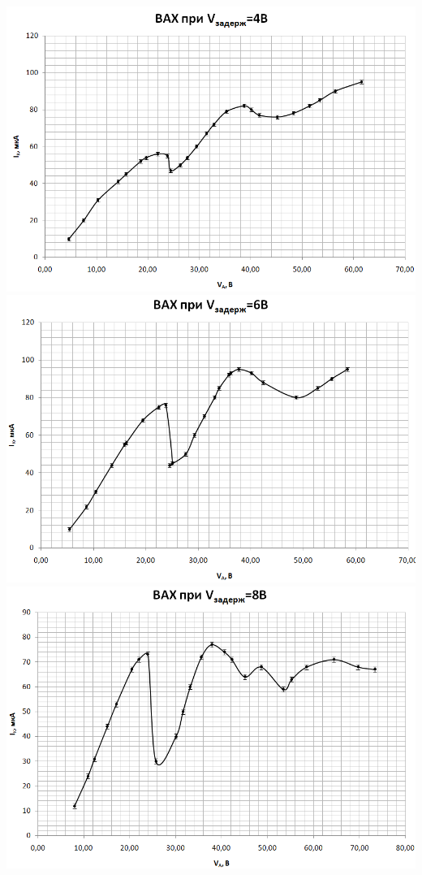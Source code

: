 \documentclass[12pt]{article}
\begin{document}
    \begin{center}
    	\includegraphics[width=15cm]{graph1.png}
    	\includegraphics[width=15cm]{graph2.png}
    	\includegraphics[width=15cm]{graph3.png}
    \end{center}
    
\end{document}
